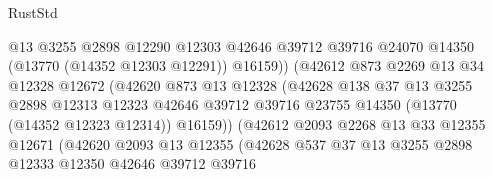 \begin{lexlean}{RustStd}
\begin{coremodule}
                                    @13
                                    @3255
                                    @2898
                                    @12290
                                    @12303
                                    @42646
                                    @39712
                                    @39716
                                    @24070
                                    @14350
                                    (@13770 (@14352 @12303 @12291))
                                    @16159))
                                (@42612
                                  @873
                                  @2269
                                  @13
                                  @34
                                  @12328
                                  @12672
                                  (@42620
                                    @873
                                    @13
                                    @12328
                                    (@42628
                                      @138
                                      @37
                                      @13
                                      @3255
                                      @2898
                                      @12313
                                      @12323
                                      @42646
                                      @39712
                                      @39716
                                      @23755
                                      @14350
                                      (@13770 (@14352 @12323 @12314))
                                      @16159))
                                  (@42612
                                    @2093
                                    @2268
                                    @13
                                    @33
                                    @12355
                                    @12671
                                    (@42620
                                      @2093
                                      @13
                                      @12355
                                      (@42628
                                        @537
                                        @37
                                        @13
                                        @3255
                                        @2898
                                        @12333
                                        @12350
                                        @42646
                                        @39712
                                        @39716

\end{coremodule}
\end{lexlean}
